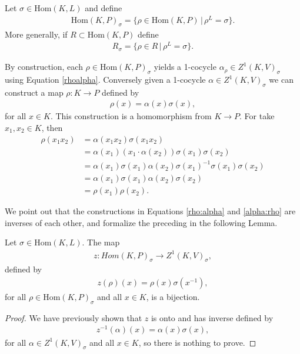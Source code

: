 \begin{definition} Let $\sigma \in \mathrm{Hom}(K, L)$ and define
\begin{align*} \mathrm{Hom}(K, P)_\sigma = \{ \rho \in \mathrm{Hom}(K, P) \,|\, \rho^L = \sigma\}. \end{align*}
More generally, if $R \subset \mathrm{Hom}(K, P)$ define
\begin{align*} R_\sigma = \{ \rho \in R \,|\, \rho^L = \sigma \}. \end{align*}
\end{definition}

By construction, each $\rho \in \mathrm{Hom}(K, P)_\sigma$ yields a 1-cocycle $\alpha_\rho \in Z^1(K, V)_\sigma$ using Equation \ref{rhoalpha}.
Conversely given a 1-cocycle $\alpha \in Z^1(K, V)_\sigma$ we can construct a map $\rho: K \rightarrow P$ defined by
\begin{align}\label{alpha:rho}
\rho(x) = \alpha(x)\sigma(x),
\end{align}
for all $x \in K$. This construction is a homomorphism from $K \rightarrow P$. For take $x_1, x_2 \in K$, then
\begin{align*}
  \rho(x_1 x_2) &= \alpha(x_1 x_2) \sigma(x_1 x_2) \\
  &= \alpha(x_1)(x_1 \cdot \alpha(x_2)) \sigma(x_1) \sigma(x_2) \\
  &= \alpha(x_1) \sigma(x_1) \alpha(x_2) \sigma(x_1)^{-1} \sigma(x_1) \sigma(x_2) \\
  &= \alpha(x_1) \sigma(x_1) \alpha(x_2) \sigma(x_2) \\
  &= \rho(x_1) \rho(x_2).
\end{align*}

We point out that the constructions in Equations \ref{rho:alpha} and \ref{alpha:rho} are inverses of each other, and formalize the preceding in the following Lemma.

\begin{lemma}
  Let $\sigma \in \mathrm{Hom}(K, L)$. The map
\begin{align*} z: Hom(K, P)_{\sigma} \rightarrow Z^1(K, V)_\sigma, \end{align*}
defined by
\begin{align*} z(\rho)(x) = \rho(x)\sigma(x^{-1}), \end{align*}
for all $\rho \in \mathrm{Hom}(K, P)_\sigma$ and all $x \in K$, is a bijection.
\label{lem:hom_z1}
\end{lemma}
\begin{proof}
We have previously shown that $z$ is onto and has inverse defined by
\begin{align*} z^{-1}(\alpha)(x) = \alpha(x)\sigma(x), \end{align*}
for all $\alpha \in Z^1(K, V)_\sigma$ and all $x \in K$, so there is nothing to prove.
\end{proof}

